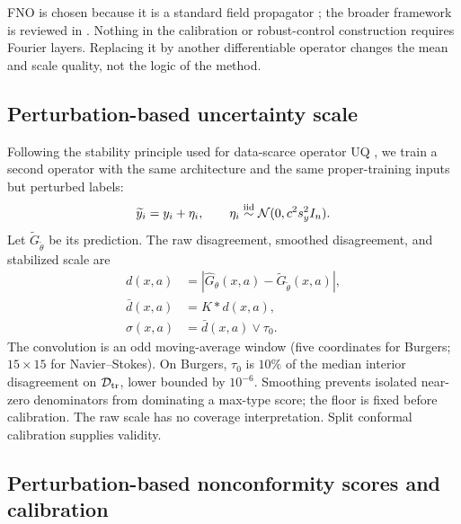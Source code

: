 \documentclass[10pt]{article}
\newcommand{\D}{\mathcal D}
\begin{document}
FNO is chosen because it is a standard field propagator
\cite{li2021fno}; the broader framework is reviewed in
\cite{kovachki2023neuraloperator}. Nothing in the calibration or
robust-control construction requires Fourier layers. Replacing it by another
differentiable operator changes the mean and scale quality, not the logic of
the method.

\subsection{Perturbation-based uncertainty scale}

Following the stability principle used for data-scarce operator UQ
\cite{wang2026perturbation}, we train a second operator with the same
architecture and the same proper-training inputs but perturbed labels:
\begin{equation}
\widetilde y_i=y_i+\eta_i,
\qquad
\eta_i\stackrel{\rm iid}{\sim}\mathcal N(0,c^2s_y^2I_n).
\label{eq:label-perturbation}
\end{equation}
Let $\widetilde G_{\widetilde\theta}$ be its prediction. The raw disagreement,
smoothed disagreement, and stabilized scale are
\begin{align}
d(x,a)&=\left|\widehat G_\theta(x,a)-
\widetilde G_{\widetilde\theta}(x,a)\right|,\label{eq:raw-disagreement}\\
\bar d(x,a)&=K\ast d(x,a),\label{eq:smooth-disagreement}\\
\sigma(x,a)&=\bar d(x,a)\vee\tau_0.
\label{eq:scale}
\end{align}
The convolution is an odd moving-average window (five coordinates for
Burgers; $15\times15$ for Navier--Stokes). On Burgers, $\tau_0$ is $10\%$ of
the median interior disagreement on $\D_{\rm tr}$, lower bounded by $10^{-6}$.
Smoothing prevents isolated near-zero denominators from dominating a max-type
score; the floor is fixed before calibration. The raw scale has no coverage
interpretation. Split conformal calibration supplies validity.

\subsection{Perturbation-based nonconformity scores and calibration}
\end{document}
